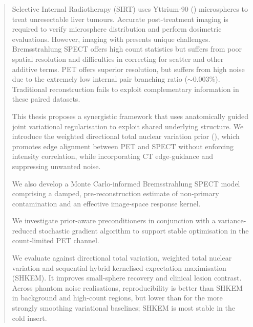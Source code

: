\begin{abstract} %
Selective Internal Radiotherapy (SIRT) uses Yttrium-90 () microspheres to treat unresectable liver tumours. Accurate post-treatment imaging is required to verify microsphere distribution and perform dosimetric evaluations. However, imaging with  presents unique challenges. Bremsstrahlung SPECT offers high count statistics but suffers from poor spatial resolution and difficulties in correcting for scatter and other additive terms.  PET offers superior resolution, but suffers from high noise due to the extremely low internal pair branching ratio ($\sim 0.003\%$). Traditional reconstruction fails to exploit complementary information in these paired datasets.

This thesis proposes a synergistic framework that uses anatomically guided joint variational regularisation to exploit shared underlying structure. We introduce the weighted directional total nuclear variation prior (\wdtnv), which promotes edge alignment between PET and SPECT without enforcing intensity correlation, while incorporating CT edge-guidance and suppressing unwanted noise.

We also develop a Monte Carlo-informed Bremsstrahlung SPECT model comprising a damped, pre-reconstruction estimate of non-primary contamination and an effective image-space response kernel.

We investigate prior-aware preconditioners in conjunction with a variance-reduced stochastic gradient algorithm to support stable optimisation in the count-limited PET channel.

We evaluate \wdtnv{} against directional total variation, weighted total nuclear variation and sequential hybrid kernelised expectation maximisation (SHKEM). It improves small-sphere recovery and clinical lesion contrast. Across phantom noise realisations, reproducibility is better than SHKEM in background and high-count regions, but lower than for the more strongly smoothing variational baselines; SHKEM is most stable in the cold insert.
\end{abstract}


